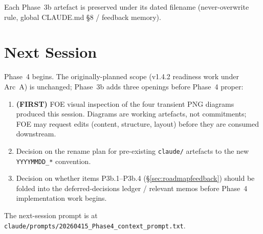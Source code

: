 \documentclass[11pt,a4paper]{article}
\begin{document}
Each Phase~3b artefact is preserved under its dated filename
(never-overwrite rule, global CLAUDE.md \S8 / feedback memory).

\section{Next Session}

Phase~4 begins. The originally-planned scope (v1.4.2 readiness work
under Arc~A) is unchanged; Phase~3b adds three openings before Phase~4
proper:

\begin{enumerate}[nosep]
    \item \textbf{(FIRST)} FOE visual inspection of the four transient PNG diagrams produced this session. Diagrams are working artefacts, not commitments; FOE may request edits (content, structure, layout) before they are consumed downstream.
    \item Decision on the rename plan for pre-existing \texttt{claude/} artefacts to the new \texttt{YYYYMMDD\_*} convention.
    \item Decision on whether items P3b.1--P3b.4 (\S\ref{sec:roadmapfeedback}) should be folded into the deferred-decisions ledger / relevant memos before Phase~4 implementation work begins.
\end{enumerate}

The next-session prompt is at
\texttt{claude/prompts/20260415\_Phase4\_context\_prompt.txt}.
\end{document}
